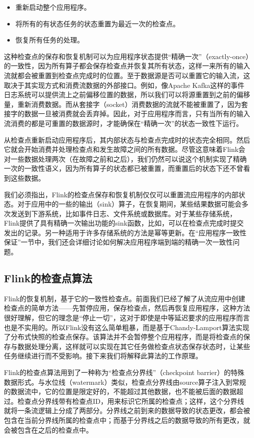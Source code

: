 \documentclass[cn,11pt,chinese]{elegantbook}
\begin{document}
\begin{itemize}
\item 重新启动整个应用程序。
\item 将所有的有状态任务的状态重置为最近一次的检查点。
\item 恢复所有任务的处理。
\end{itemize}

这种检查点的保存和恢复机制可以为应用程序状态提供“精确一次”（exactly-once）的一致性，因为所有算子都会保存检查点并恢复其所有状态，这样一来所有的输入流就都会被重置到检查点完成时的位置。至于数据源是否可以重置它的输入流，这取决于其实现方式和消费流数据的外部接口。例如，像Apache Kafka这样的事件日志系统可以提供流上之前偏移位置的数据，所以我们可以将源重置到之前的偏移量，重新消费数据。而从套接字（socket）消费数据的流就不能被重置了，因为套接字的数据一旦被消费就会丢弃掉。因此，对于应用程序而言，只有当所有的输入流消费的都是可重置的数据源时，才能确保在“精确一次”的状态一致性下运行。

从检查点重新启动应用程序后，其内部状态与检查点完成时的状态完全相同。然后它就会开始消费并处理检查点和发生故障之间的所有数据。尽管这意味着Flink会对一些数据处理两次（在故障之前和之后），我们仍然可以说这个机制实现了精确一次的一致性语义，因为所有算子的状态都已被重置，而重置后的状态下还不曾看到这些数据。

我们必须指出，Flink的检查点保存和恢复机制仅仅可以重置流应用程序的内部状态。对于应用中的一些的输出（sink）算子，在恢复期间，某些结果数据可能会多次发送到下游系统，比如事件日志、文件系统或数据库。对于某些存储系统，Flink提供了具有精确一次输出功能的sink函数，比如，可以在检查点完成时提交发出的记录。另一种适用于许多存储系统的方法是幂等更新。在“应用程序一致性保证”一节中，我们还会详细讨论如何解决应用程序端到端的精确一次一致性问题。

\subsection{Flink的检查点算法}

Flink的恢复机制，基于它的一致性检查点。前面我们已经了解了从流应用中创建检查点的简单方法——先暂停应用，保存检查点，然后再恢复应用程序，这种方法很好理解，但它的理念是“停止一切”，这对于即使是中等延迟要求的应用程序而言也是不实用的。所以Flink没有这么简单粗暴，而是基于Chandy-Lamport算法实现了分布式快照的检查点保存。该算法并不会暂停整个应用程序，而是将检查点的保存与数据处理分离，这样就可以实现在其它任务做检查点状态保存状态时，让某些任务继续进行而不受影响。接下来我们将解释此算法的工作原理。

Flink的检查点算法用到了一种称为“检查点分界线”（checkpoint barrier）的特殊数据形式。与水位线（watermark）类似，检查点分界线由source算子注入到常规的数据流中，它的位置是限定好的，不能超过其他数据，也不能被后面的数据超过。检查点分界线带有检查点ID，用来标识它所属的检查点；这样，这个分界线就将一条流逻辑上分成了两部分。分界线之前到来的数据导致的状态更改，都会被包含在当前分界线所属的检查点中；而基于分界线之后的数据导致的所有更改，就会被包含在之后的检查点中。
\end{document}
